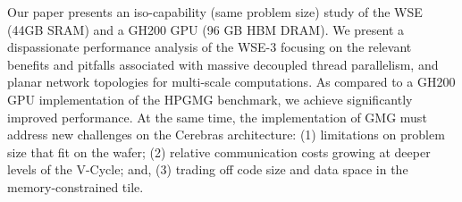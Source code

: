 \documentclass[conference]{IEEEtran}
\begin{document}
        Our paper presents an iso-capability (same problem size) study of the WSE (44GB SRAM) and a GH200 GPU (96 GB HBM DRAM).  We present a dispassionate performance analysis of the WSE-3 focusing on the relevant benefits and pitfalls associated with massive decoupled thread parallelism, and planar network topologies for multi-scale computations.  As compared to a GH200 GPU implementation of the HPGMG benchmark, we achieve significantly improved performance.  At the same time,
        the implementation of GMG must address new challenges on the Cerebras architecture: (1) limitations on problem size that fit on the wafer; (2) relative communication costs growing at deeper levels of the V-Cycle; and, (3) trading off code size and data space in the memory-constrained tile.
\end{document}
